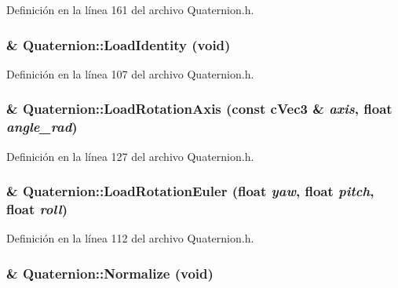 Definición en la línea 161 del archivo Quaternion.h.

\hypertarget{struct_quaternion_a31ffb4ff1cb6adb94798fd5e89fd96dd}{
\subsubsection[{LoadIdentity}]{ \& Quaternion::LoadIdentity (void)}}
\label{struct_quaternion_a31ffb4ff1cb6adb94798fd5e89fd96dd}


Definición en la línea 107 del archivo Quaternion.h.

\hypertarget{struct_quaternion_a0ff63fa162a83bfffb51204778907b65}{
\subsubsection[{LoadRotationAxis}]{ \& Quaternion::LoadRotationAxis (const {\bf cVec3} \& {\em axis}, \/  float {\em angle\_\-rad})}}
\label{struct_quaternion_a0ff63fa162a83bfffb51204778907b65}


Definición en la línea 127 del archivo Quaternion.h.

\hypertarget{struct_quaternion_a3c99a53b568de7f5615c96bd906ff4dc}{
\subsubsection[{LoadRotationEuler}]{ \& Quaternion::LoadRotationEuler (float {\em yaw}, \/  float {\em pitch}, \/  float {\em roll})}}
\label{struct_quaternion_a3c99a53b568de7f5615c96bd906ff4dc}


Definición en la línea 112 del archivo Quaternion.h.

\hypertarget{struct_quaternion_a1abadacdc1ee6a236cde78c9bd1229b1}{
\subsubsection[{Normalize}]{ \& Quaternion::Normalize (void)}}
\label{struct_quaternion_a1abadacdc1ee6a236cde78c9bd1229b1}


